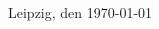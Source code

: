 \begin{titlepage}
\begin{addmargin}[-1cm]{-3cm}
\begin{center}
        Leipzig, den \today\vfill



        

        
%        
%
%

    \end{center}  
  \end{addmargin}       
\end{titlepage}   

